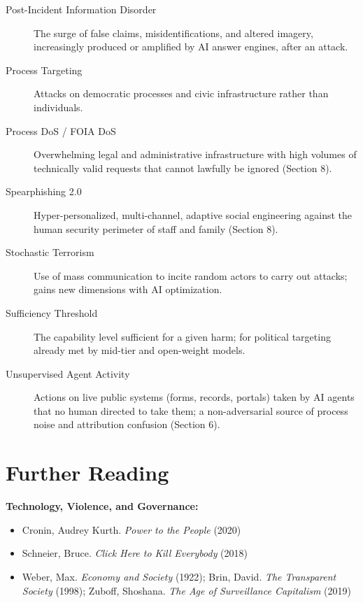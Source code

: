 \documentclass[11pt,letterpaper]{article}
\begin{document}
\begin{description}
  \item[Post-Incident Information Disorder] The surge of false claims, misidentifications, and altered imagery, increasingly produced or amplified by AI answer engines, after an attack.
  \item[Process Targeting] Attacks on democratic processes and civic infrastructure rather than individuals.
  \item[Process DoS / FOIA DoS] Overwhelming legal and administrative infrastructure with high volumes of technically valid requests that cannot lawfully be ignored (Section 8).
  \item[Spearphishing 2.0] Hyper-personalized, multi-channel, adaptive social engineering against the human security perimeter of staff and family (Section 8).
  \item[Stochastic Terrorism] Use of mass communication to incite random actors to carry out attacks; gains new dimensions with AI optimization.
  \item[Sufficiency Threshold] The capability level sufficient for a given harm; for political targeting already met by mid-tier and open-weight models.
  \item[Unsupervised Agent Activity] Actions on live public systems (forms, records, portals) taken by AI agents that no human directed to take them; a non-adversarial source of process noise and attribution confusion (Section 6).
\end{description}

\section{Further Reading}

\textbf{Technology, Violence, and Governance:}
\begin{itemize}[nosep]
  \item Cronin, Audrey Kurth. \textit{Power to the People} (2020)
  \item Schneier, Bruce. \textit{Click Here to Kill Everybody} (2018)
  \item Weber, Max. \textit{Economy and Society} (1922); Brin, David. \textit{The Transparent Society} (1998); Zuboff, Shoshana. \textit{The Age of Surveillance Capitalism} (2019)
\end{itemize}
\end{document}
